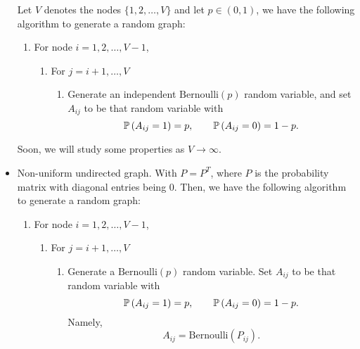 \begin{itemize}
	      Let \(V\) denotes the nodes \(\{1, 2, \ldots , V\}\) and let \(p\in(0, 1)\), we have the following algorithm to generate a random graph:
	      \begin{enumerate}
		      \item For node \(i = 1, 2, \ldots , V - 1\),
		            \begin{enumerate}
			            \item For \(j = i+1, \ldots , V\)
			                  \begin{enumerate}
				                  \item Generate an independent \(\mathrm{Bernoulli}(p)\) random variable, and set \(A_{ij}\) to be that random variable with
				                        \[
					                        \mathbb{\MakeUppercase{P}}\left( A_{ij} = 1 \right) = p, \qquad \mathbb{\MakeUppercase{P}}\left( A_{ij} = 0 \right) = 1-p  .
				                        \]
			                  \end{enumerate}
		            \end{enumerate}
	      \end{enumerate}
	      Soon, we will study some properties as \(V\to \infty\).
	\item Non-uniform undirected graph. With \(P = P^{T}\), where \(P\) is the probability matrix with diagonal entries being \(0\). Then, we have the following algorithm to
	      generate a random graph:
	      \begin{enumerate}
		      \item For node \(i = 1, 2, \ldots , V - 1\),
		            \begin{enumerate}
			            \item For \(j = i+1, \ldots , V\)
			                  \begin{enumerate}
				                  \item Generate a \(\mathrm{Bernoulli}(p)\) random variable. Set \(A_{ij}\) to be that random variable with
				                        \[
					                        \mathbb{\MakeUppercase{P}}\left( A_{ij} = 1 \right) = p, \qquad \mathbb{\MakeUppercase{P}}\left( A_{ij} = 0 \right) = 1-p  .
				                        \]
				                        Namely,
				                        \[
					                        A_{ij} = \mathrm{Bernoulli}(P_{ij}).
				                        \]
			                  \end{enumerate}
		            \end{enumerate}
	      \end{enumerate}

\end{itemize}
